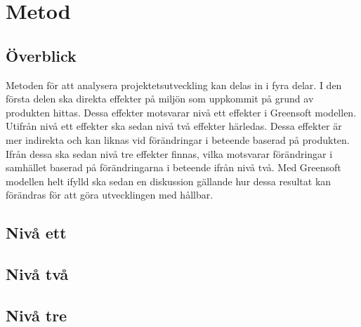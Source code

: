 \section{Metod}
\label{sec:joel_a-method}

\subsection{Överblick}
Metoden för att analysera projektetsutveckling kan delas in i fyra delar. I den första delen ska direkta effekter på miljön som uppkommit på grund av produkten hittas. Dessa effekter motsvarar nivå ett effekter i Greensoft modellen. Utifrån nivå ett effekter ska sedan nivå två effekter härledas. Dessa effekter är mer indirekta och kan liknas vid förändringar i beteende baserad på produkten. Ifrån dessa ska sedan nivå tre effekter finnas, vilka motsvarar förändringar i samhället baserad på förändringarna i beteende ifrån nivå två. Med Greensoft modellen helt ifylld ska sedan en diskussion gällande hur dessa resultat kan förändras för att göra utvecklingen med hållbar.

\subsection{Nivå ett}

\subsection{Nivå två}

\subsection{Nivå tre}